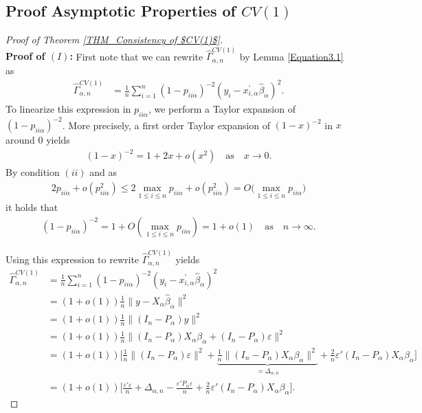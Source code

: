 \documentclass[Research_Module_ES.tex]{subfiles}
\begin{document}
\subsection*{Proof Asymptotic Properties of $CV(1)$}
\begin{proof}[Proof of Theorem \ref{THM_Consistency of $CV(1)$}]~\\
	\textbf{Proof of $(I)$:} First note that we can rewrite $\hat{\Gamma}_{\alpha,n}^{CV(1)}$  by Lemma \ref{Equation3.1} as 
	\begin{align*}
	\hat{\Gamma}_{\alpha,n}^{CV(1)} &= \frac{1}{n}\sum_{i=1}^n (1- p_{ii\alpha})^{-2}(y_i-x_{i,\alpha}^\prime\hat{\beta}_\alpha)^2.
	\end{align*}
	To linearize this expression in $p_{ii\alpha}$, we perform a Taylor expansion of $(1-p_{ii\alpha})^{-2}$.
	More precisely, a first order Taylor expansion of $(1-x)^{-2}$ in $x$ around $0$ yields 
	\begin{align}
	(1- x)^{-2} = 1+ 2 x + o(x^2) \quad \textrm{as} \quad x\to 0 .\label{proof_CV(1)_1}
	\end{align}
	By condition $(ii)$ and as
	\begin{align*}
	2p_{ii\alpha} + o(p_{ii\alpha}^2) 
	\le 2 \max_{1\le i \le n} p_{ii\alpha} +  o(p_{ii\alpha}^2) 
	= O\bigl(\max _{1\le i \le n} p_{ii\alpha}\bigr)
	\end{align*}
	it holds that 
	\begin{align*}
	(1- p_{ii\alpha})^{-2} = 1+ O(\max _{1\le i \le n} p_{ii\alpha}) 
	= 1 +o(1) \quad \textrm{as} \quad n \to \infty. 
	\end{align*}
	
	Using this expression to rewrite $\hat{\Gamma}_{\alpha,n}^{CV(1)}$ yields
	\begin{align}
	\hat{\Gamma}_{\alpha,n}^{CV(1)} &= \frac{1}{n}\sum_{i=1}^n (1- p_{ii\alpha})^{-2}(y_i-x_{i,\alpha}^\prime\hat{\beta}_\alpha)^2\nonumber\\
	&= (1+o(1))\frac{1}{n}\lVert y-X_{\alpha}\hat{\beta}_\alpha\rVert^2\nonumber\\
	&= (1+o(1))\frac{1}{n}\lVert (I_n-P_\alpha) y\rVert^2\nonumber\\
	&= (1+o(1))\frac{1}{n}\lVert (I_n-P_\alpha) X_\alpha\beta_\alpha +(I_n-P_\alpha)\varepsilon \rVert^2\nonumber\\
	&= (1+o(1))\biggl[\frac{1}{n}\lVert(I_n-P_\alpha)\varepsilon \rVert^2+ \underbrace{\frac{1}{n}\lVert (I_n-P_\alpha) X_\alpha\beta_\alpha\rVert^2}_{=\Delta_{\alpha,n}} +\frac{2}{n}\varepsilon'(I_n-P_\alpha) X_\alpha\beta_\alpha\biggr]\nonumber\\
	&= (1+o(1)) \biggl[\frac{\varepsilon'\varepsilon}{n} + \Delta_{\alpha,n} - \frac{\varepsilon'P_\alpha\varepsilon}{n} +\frac{2}{n}\varepsilon'(I_n-P_\alpha) X_\alpha\beta_\alpha\biggr]. \label{proof_CV(1)_2}
	\end{align}
	

\end{proof}
\end{document}
